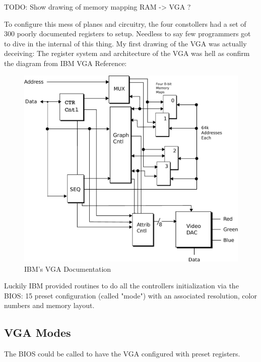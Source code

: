 \documentclass[book.tex]{subfiles}
\begin{document}
TODO: Show drawing of memory mapping RAM -> VGA ?
 

 

\bigskip
To configure this mess of planes and circuitry, the four constollers had a set of 300 poorly documented registers to setup. Needless to say few programmers got to dive in the internal of this thing. My first drawing of the VGA was actually deceiving: The register system and architecture of the VGA was hell as confirm the diagram from IBM VGA Reference:\\
 \begin{figure}[H]
\centering
\includegraphics[width=\textwidth]{imgs/ibm_vga.eps}
%
\caption{IBM's VGA Documentation}
\label{fig:ibm_vga}
\end{figure}

\bigskip



Luckily IBM provided routines to do all the controllers initialization via the BIOS: 15 preset configuration (called "mode") with an associated resolution, color numbers and memory layout.

\subsection{VGA Modes}

The BIOS could be called to have the VGA configured with preset registers.
\end{document}
